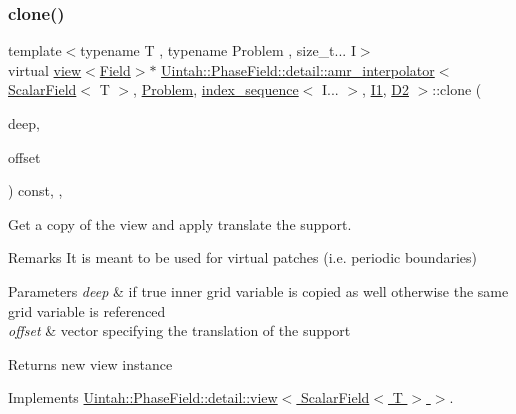 \subsubsection{\texorpdfstring{clone()}{clone()}\hspace{0.1cm}{\footnotesize\ttfamily [2/2]}}
{\footnotesize\ttfamily template$<$typename T , typename Problem , size\+\_\+t... I$>$ \\
virtual \hyperlink{classUintah_1_1PhaseField_1_1detail_1_1view}{view}$<$\hyperlink{structUintah_1_1PhaseField_1_1ScalarField}{Field}$>$$\ast$ \hyperlink{classUintah_1_1PhaseField_1_1detail_1_1amr__interpolator}{Uintah\+::\+Phase\+Field\+::detail\+::amr\+\_\+interpolator}$<$ \hyperlink{structUintah_1_1PhaseField_1_1ScalarField}{Scalar\+Field}$<$ T $>$, \hyperlink{classUintah_1_1PhaseField_1_1Problem}{Problem}, \hyperlink{namespaceUintah_1_1PhaseField_a237de804d99512e50613aff7c94a9461}{index\+\_\+sequence}$<$ I... $>$, \hyperlink{namespaceUintah_1_1PhaseField_a547ce3002aa97fbd3ef3192a6eec8406a66f19efe774b0d2b6e5844eb2d83d305}{I1}, \hyperlink{namespaceUintah_1_1PhaseField_a12bfc68444894dffdf0cb8d9cf0cc76aa1a451dae278b0103a94105c8776e9a67}{D2} $>$\+::clone (\begin{DoxyParamCaption}\item[{bool}]{deep,  }\item[{const Int\+Vector \&}]{offset }\end{DoxyParamCaption}) const\hspace{0.3cm}{\ttfamily [inline]}, {\ttfamily [override]}, {\ttfamily [virtual]}}



Get a copy of the view and apply translate the support. 

\begin{DoxyRemark}{Remarks}
It is meant to be used for virtual patches (i.\+e. periodic boundaries)
\end{DoxyRemark}

\begin{DoxyParams}{Parameters}
{\em deep} & if true inner grid variable is copied as well otherwise the same grid variable is referenced \\
\hline
{\em offset} & vector specifying the translation of the support \\
\hline
\end{DoxyParams}
\begin{DoxyReturn}{Returns}
new view instance 
\end{DoxyReturn}


Implements \hyperlink{classUintah_1_1PhaseField_1_1detail_1_1view_3_01ScalarField_3_01T_01_4_01_4_abd928104240e329f3bc4441ebab7c50c}{Uintah\+::\+Phase\+Field\+::detail\+::view$<$ Scalar\+Field$<$ T $>$ $>$}.

